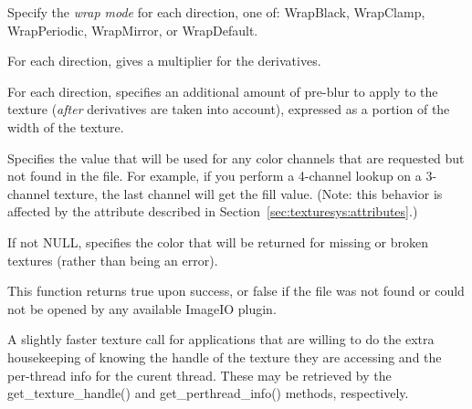 \vspace{-24pt}
\vspace{10pt}
Specify the \emph{wrap mode} for each direction, one of: 
{\cf WrapBlack}, {\cf WrapClamp}, {\cf WrapPeriodic}, {\cf WrapMirror},
or {\cf WrapDefault}.
\apiend

\vspace{-24pt}
\vspace{10pt}
For each direction, gives a multiplier for the derivatives.
\apiend

\vspace{-24pt}
\vspace{10pt}
For each direction, specifies an additional amount of pre-blur to apply
to the texture (\emph{after} derivatives are taken into account),
expressed as a portion of the width of the texture.
\apiend

\vspace{-24pt}
\vspace{10pt}
Specifies the value that will be used for any color channels that are
requested but not found in the file.  For example, if you perform a
4-channel lookup on a 3-channel texture, the last channel will
get the fill value.  (Note: this behavior is affected by the
 attribute described in 
Section~\ref{sec:texturesys:attributes}.)
\apiend

\vspace{-24pt}
\vspace{10pt}
If not NULL, specifies the color that will be returned for missing or
broken textures (rather than being an error).
\apiend

This function returns {\cf true} upon success, or {\cf false} if the
file was not found or could not be opened by any available ImageIO
plugin.
\apiend


A slightly faster {\cf texture} call for applications that are willing
to do the extra housekeeping of knowing the handle of the texture they
are accessing and the per-thread info for the curent thread.  These
may be retrieved by the {\cf get_texture_handle()} and 
{\cf get_perthread_info()} methods, respectively.
\apiend



